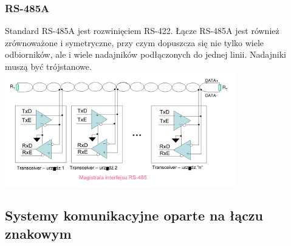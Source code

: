 \documentclass[a4paper,twoside]{article}
\begin{document}
		\subsubsection{RS-485A}
		Standard RS-485A jest rozwinięciem RS-422. Łącze RS-485A jest również zrównoważone i symetryczne, przy czym dopuszcza się nie tylko wiele odbiorników, ale i wiele nadajników podłączonych do jednej linii. Nadajniki muszą być trójstanowe.\\
		\includegraphics[width=10cm]{./wyklady/RS232_13_1.pdf}
	\subsection{Systemy komunikacyjne oparte na łączu znakowym}
\end{document}
